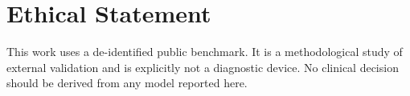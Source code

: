 \documentclass[manuscript,nonacm]{acmart}
\begin{document}
\section*{Ethical Statement}
This work uses a de-identified public benchmark. It is a methodological study of
external validation and is explicitly not a diagnostic device. No clinical decision
should be derived from any model reported here.



\end{document}
